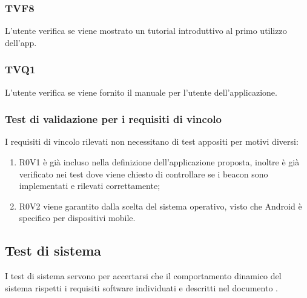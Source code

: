 		\subsubsection{TVF8}
			L'utente verifica se viene mostrato un tutorial introduttivo al primo utilizzo dell'app.
		\subsubsection{TVQ1}
			L'utente verifica se viene fornito il manuale per l'utente dell'applicazione.
		\subsubsection{Test di validazione per i requisiti di vincolo} %
			I requisiti di vincolo rilevati non necessitano di test appositi per motivi diversi:
			\begin{enumerate}
				\item R0V1 è già incluso nella definizione dell'applicazione proposta, inoltre è già verificato nei test dove viene chiesto di controllare se i beacon sono implementati e rilevati correttamente;
				\item R0V2 viene garantito dalla scelta del sistema operativo, visto che Android è specifico per dispositivi mobile.
			\end{enumerate}
	\subsection{Test di sistema}
	\label{sec:5.4}
		I test di sistema servono per accertarsi che il comportamento dinamico del sistema rispetti i requisiti software individuati e descritti nel documento \ARdoc.
